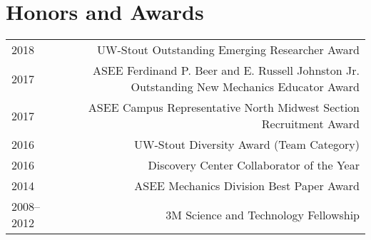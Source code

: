 \section*{Honors and Awards}
\begin{tabular}{L!{\VRule}R}
2018&UW-Stout Outstanding Emerging Researcher Award\\
2017&ASEE Ferdinand P. Beer and E. Russell Johnston Jr. Outstanding New Mechanics Educator Award\\
2017&ASEE Campus Representative North Midwest Section Recruitment Award\\
2016&UW-Stout Diversity Award (Team Category)\\
2016&Discovery Center Collaborator of the Year\\
2014&ASEE Mechanics Division Best Paper Award\\
2008--2012&3M Science and Technology Fellowship\\
\end{tabular}